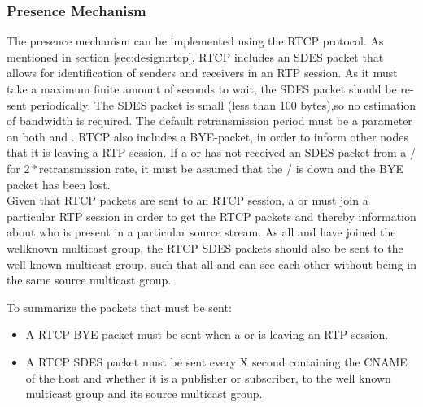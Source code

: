 \subsubsection{Presence Mechanism} \label{sec:design:presencemechanism}
The presence mechanism can be implemented using the RTCP protocol. As mentioned in section \ref{sec:design:rtcp}, RTCP includes an SDES packet that allows for identification of senders and receivers in an RTP session.
As it must take a maximum finite amount of seconds to wait, the SDES  packet should be re-sent periodically. The SDES packet is small (less than 100 bytes),so no estimation of bandwidth is required. The default retransmission period must be a parameter on both \sub{} and \pub{}.
RTCP also includes a BYE-packet, in order to inform other nodes that it is leaving a RTP session.
If a  or  has not received an SDES packet from a / for $2*\text{retransmission rate}$, it must be assumed that the / is down and the BYE packet has been lost.\\

Given that RTCP packets are sent to an RTCP session, a \sub{} or \pub{} must join a particular RTP session in order to get the RTCP packets and thereby information about who is present in a particular source stream. As all \pubs{} and \subs{} have joined the wellknown multicast group, the RTCP SDES packets should also be sent to the well known multicast group, such that all \pubs{} and \subs{} can see each other without being in the same source multicast group.

To summarize the packets that must be sent:
\begin{itemize}
	\item A RTCP BYE packet must be sent when a \sub{} or \pub{} is leaving an RTP session.
	\item A RTCP SDES packet must be sent every X second containing the CNAME of the host and whether it is a publisher or subscriber, to the well known multicast group and its source multicast group.
\end{itemize}




